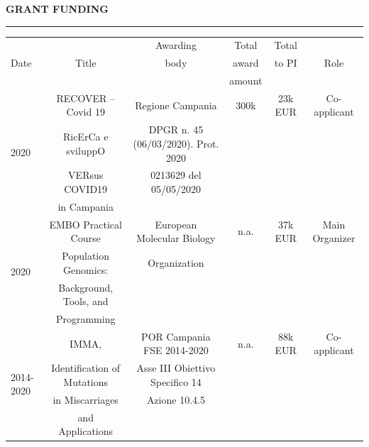 \documentclass[openany]{book}
\begin{document}
\vspace{0.4cm}
\noindent
\MakeUppercase{\textbf{Grant Funding}} \vspace{0.2cm}
\hrule
\vspace{0.15cm}
\noindent
\begin{table}[ht]
\centering
\resizebox{\textwidth}{!}
{\begin{tabular}{ |l | c | c | c | c | c | }
\hline
\multirow{3}{*}{Date} & \multirow{3}{*}{Title} & Awarding & Total & Total &   \multirow{3}{*}{Role}\\ 
&  & body & award &  to PI &  \\
&  &  & amount &  &   \\ \hline
\multirow{4}{*}{2020}  & RECOVER – Covid 19  & Regione Campania & 300k & 23k EUR & Co-applicant \\
& RicErCa e sviluppO  & DPGR n. 45 (06/03/2020). Prot. 2020 &  & & \\
&  VERsus COVID19   & 0213629 del 05/05/2020  &  & & \\
& in Campania &  &  & & \\\hline

\multirow{4}{*}{2020}  & EMBO Practical Course  & European Molecular Biology & n.a. & 37k EUR & Main Organizer \\
& Population Genomics:   & Organization &  & & \\
& Background, Tools, and &  &  & & \\
& Programming &  &  & & \\\hline

\multirow{4}{*}{2014-2020}  & IMMA, & POR Campania FSE 2014-2020 &  n.a. & 88k EUR & Co-applicant \\
&  Identification of Mutations  & Asse III Obiettivo Specifico 14 &  &   & \\
& in Miscarriages  & Azione 10.4.5 & & & \\
& and Applications & & & & \\\hline


\end{tabular}}
\end{table}
\end{document}
